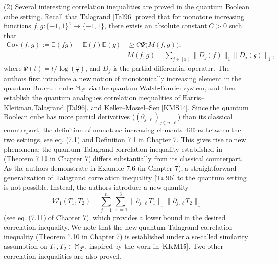 \documentclass[a4paper, 11pt]{article}
\begin{document}
 (2) Several interesting correlation inequalities are proved in the quantum Boolean cube setting. Recall that Talagrand [Tal96] proved that for monotone increasing functions 
 $f,g: \{-1,1\}^n\to \{-1,1\}$, there exists an absolute constant $C>0$ such that 
 \begin{equation}\label{Ta 96}
 	\begin{split}
 		\mathrm{Cov}(f,g):=\mathbb{E}(fg)-\mathbb{E}(f)\mathbb{E}(g)&\geq C \Psi\Big(M(f,g)\Big),\\
 		& M(f,g)=\sum_{j\in [n]} \|D_j(f)\|_{1}\|D_j(g)\|_{1},
 	\end{split}
 \end{equation}
 where $\Psi(t)=t/\log(\frac{e}{t})$, and $D_j$ is the partial differential operator. The authors first introduce a new notion of monotonically increasing element in the quantum Boolean cube $\mathbb{M}_{2^n}$ via the quantum Walsh-Fourier system, and then establish the quantum analogues correlation inequalities of  Harris–Kleitman,Talagrand [Tal96], and Keller–Mossel–Sen [KMS14]. Since the quantum Boolean cube has more partial derivatives ($(\partial_{j,\ell})_{j\in n,\ell}$) than its classical counterpart, the definition of monotone increasing elements differs between the two settings, see eq. (7.1) and Definition 7.1 in Chapter 7.  This gives rise to new phenomena: the quantum Talagrand correlation inequality established in (Theorem 7.10 in Chapter 7)  differs substantially from its classical counterpart. 
 As the authors demonstrate in Example 7.6 (in Chapter 7), a straightforward generalization of Talagrand  correlation inequality \eqref{Ta 96}  to the quantum setting is not possible.
 Instead, the authors introduce a new quantity 
 $$\mathcal{W}_1(T_1,T_2)=\sum_{j=1}^n\sum_{\ell=1}^3\|\partial_{j,\ell}T_1\|_{1}\|\partial_{j,\ell}T_2\|_{1}$$ (see eq. (7.11) of Chapter 7), which provides a lower bound in the desired correlation inequality. We note that the new quantum Talagrand correlation inequality (Theorem 7.10 in Chapter 7) is established under a so-called similarity assumption on $T_1,T_2\in \mathbb{M}_{2^n}$, inspired by the work in [KKM16]. Two other correlation inequalities are also proved. 
 
   \medskip
 
\end{document}
